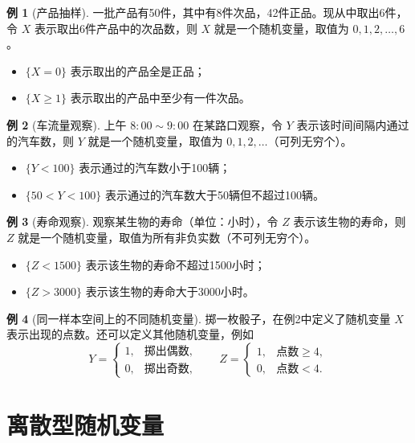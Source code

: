 \documentclass[11pt,a4paper]{report}
\theoremstyle{definition}
\newtheorem{example}{例}[chapter]
\begin{document}
\begin{example}[产品抽样]
一批产品有50件，其中有8件次品，42件正品。现从中取出6件，令 $X$ 表示取出6件产品中的次品数，则 $X$ 就是一个随机变量，取值为 $0,1,2,\dots,6$。
\begin{itemize}[leftmargin=2em]
    \item $\{X=0\}$ 表示取出的产品全是正品；
    \item $\{X \geq 1\}$ 表示取出的产品中至少有一件次品。
\end{itemize}
\end{example}

\begin{example}[车流量观察]
上午 $8{:}00 \sim 9{:}00$ 在某路口观察，令 $Y$ 表示该时间间隔内通过的汽车数，则 $Y$ 就是一个随机变量，取值为 $0,1,2,\dots$（可列无穷个）。
\begin{itemize}[leftmargin=2em]
    \item $\{Y < 100\}$ 表示通过的汽车数小于100辆；
    \item $\{50 < Y < 100\}$ 表示通过的汽车数大于50辆但不超过100辆。
\end{itemize}
\end{example}

\begin{example}[寿命观察]
观察某生物的寿命（单位：小时），令 $Z$ 表示该生物的寿命，则 $Z$ 就是一个随机变量，取值为所有非负实数（不可列无穷个）。
\begin{itemize}[leftmargin=2em]
    \item $\{Z < 1500\}$ 表示该生物的寿命不超过1500小时；
    \item $\{Z > 3000\}$ 表示该生物的寿命大于3000小时。
\end{itemize}
\end{example}

\begin{example}[同一样本空间上的不同随机变量]
掷一枚骰子，在例2中定义了随机变量 $X$ 表示出现的点数。还可以定义其他随机变量，例如
\[
Y = \begin{cases} 1, & \text{掷出偶数}, \\ 0, & \text{掷出奇数}, \end{cases} \qquad
Z = \begin{cases} 1, & \text{点数} \geq 4, \\ 0, & \text{点数} < 4. \end{cases}
\]
\end{example}

\section{离散型随机变量}
\end{document}
